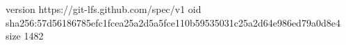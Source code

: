 version https://git-lfs.github.com/spec/v1
oid sha256:57d56186785efc1fcea25a2d5a5fce110b59535031c25a2d64e986ed79a0d8e4
size 1482
